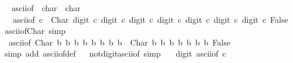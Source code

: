 \begin{isabellebody}
{}
\isamarkuptrue%
%
\endisatagdocument
{\isafolddocument}%
%
\isadelimdocument
%
\endisadelimdocument
{}\isamarkupfalse%
\isanewline
{}\isanewline
\isanewline
{}\ \isamarkupfalse%
\ ascii{\isacharunderscore}{\kern0pt}of\ {\isacharcolon}{\kern0pt}{\isacharcolon}{\kern0pt}\ {\isachardoublequoteopen}char\ {\isasymRightarrow}\ char{\isachardoublequoteclose}\isanewline
\ \ \ {\isachardoublequoteopen}ascii{\isacharunderscore}{\kern0pt}of\ c\ {\isacharequal}{\kern0pt}\ Char\ {\isacharparenleft}{\kern0pt}digit{}\ c{\isacharparenright}{\kern0pt}\ {\isacharparenleft}{\kern0pt}digit{}\ c{\isacharparenright}{\kern0pt}\ {\isacharparenleft}{\kern0pt}digit{}\ c{\isacharparenright}{\kern0pt}\ {\isacharparenleft}{\kern0pt}digit{}\ c{\isacharparenright}{\kern0pt}\ {\isacharparenleft}{\kern0pt}digit{}\ c{\isacharparenright}{\kern0pt}\ {\isacharparenleft}{\kern0pt}digit{}\ c{\isacharparenright}{\kern0pt}\ {\isacharparenleft}{\kern0pt}digit{}\ c{\isacharparenright}{\kern0pt}\ False{\isachardoublequoteclose}\isanewline
\isanewline
{}\ \isamarkupfalse%
\ ascii{\isacharunderscore}{\kern0pt}of{\isacharunderscore}{\kern0pt}Char\ {\isacharbrackleft}{\kern0pt}simp{\isacharbrackright}{\kern0pt}{\isacharcolon}{\kern0pt}\isanewline
\ \ {\isachardoublequoteopen}ascii{\isacharunderscore}{\kern0pt}of\ {\isacharparenleft}{\kern0pt}Char\ b{}\ b{}\ b{}\ b{}\ b{}\ b{}\ b{}\ b{}{\isacharparenright}{\kern0pt}\ {\isacharequal}{\kern0pt}\ Char\ b{}\ b{}\ b{}\ b{}\ b{}\ b{}\ b{}\ False{\isachardoublequoteclose}\isanewline
%
\isadelimproof
\ \ %
\endisadelimproof
%
\isatagproof
{}\isamarkupfalse%
\ {\isacharparenleft}{\kern0pt}simp\ add{\isacharcolon}{\kern0pt}\ ascii{\isacharunderscore}{\kern0pt}of{\isacharunderscore}{\kern0pt}def{\isacharparenright}{\kern0pt}\isanewline
\isanewline
{}%
\endisatagproof
{\isafoldproof}%
%
\isadelimproof
%
\endisadelimproof
\ \isamarkupfalse%
\ not{\isacharunderscore}{\kern0pt}digit{}{\isacharunderscore}{\kern0pt}ascii{\isacharunderscore}{\kern0pt}of\ {\isacharbrackleft}{\kern0pt}simp{\isacharbrackright}{\kern0pt}{\isacharcolon}{\kern0pt}\isanewline
\ \ {\isachardoublequoteopen}{\isasymnot}\ digit{}\ {\isacharparenleft}{\kern0pt}ascii{\isacharunderscore}{\kern0pt}of\ c{\isacharparenright}{\kern0pt}{\isachardoublequoteclose}\isanewline

\end{isabellebody}
